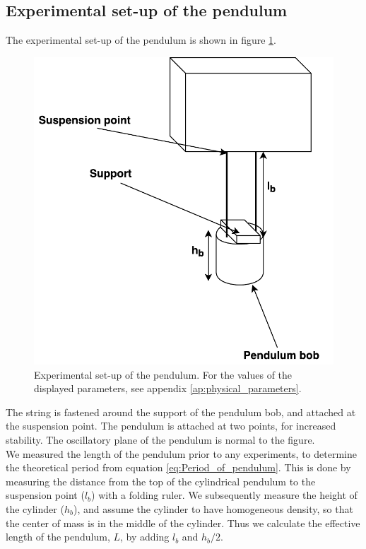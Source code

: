 \documentclass[a4paper, 10pt]{article}
\begin{document}
\subsection{Experimental set-up of the pendulum}
The experimental set-up of the pendulum is shown in figure \ref{fig:Experiment_setup1}.
\begin{figure}[ht!]
\centering
\includegraphics[scale=0.5]{FYS2150Lab1Diagram1.pdf}
\caption{Experimental set-up of the pendulum. For the values of the displayed parameters, see appendix \ref{ap:physical_parameters}.}\label{fig:Experiment_setup1}
\end{figure}
The string is fastened around the support of the pendulum bob, and attached at the suspension point. The pendulum is attached at two points, for increased stability. The oscillatory plane of the pendulum is normal to the figure.\\
\linebreak
We measured the length of the pendulum prior to any experiments, to determine the theoretical period from equation \ref{eq:Period_of_pendulum}. This is done by measuring the distance from the top of the cylindrical pendulum to the suspension point ($l_b$) with a folding ruler. We subsequently measure the height of the cylinder ($h_b$), and assume the cylinder to have homogeneous density, so that the center of mass is in the middle of the cylinder. Thus we calculate the effective length of the pendulum, $L$, by adding $l_b$ and $h_b/2$.\\
\end{document}
